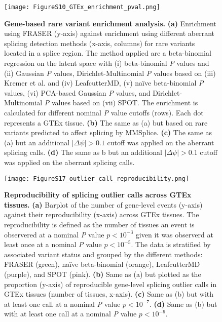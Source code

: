 \documentclass[a4paper,12pt]{article}
\begin{document}
\begin{figure}[h]
\centering
	\texttt{[image: FigureS10\_GTEx\_enrichment\_pval.png]}
	\caption{
	    \textbf{Gene-based rare variant enrichment analysis.}
	    \textbf{(a)} Enrichment using FRASER (y-axis) against enrichment using
different aberrant splicing detection methods (x-axis, columns) for rare variants
located in a splice region. The method applied are a beta-binomial regression on 
the latent space with (i) beta-binomial \textit{P} values and (ii) Gaussian
\textit{P} values, Dirichlet-Multinomial \textit{P} values based on
(iii) Kremer et al. and (iv) LeafcutterMD, (v) na\"ive beta-binomial \textit{P} values, (vi) 
PCA-based Gaussian \textit{P} values, and Dirichlet-Multinomial \textit{P}
values based on (vii) SPOT. The enrichment is calculated for different 
nominal \textit{P} value cutoffs (rows). Each dot represents a GTEx tissue. 
\textbf{(b)} The same as (a) but based on rare variants predicted to affect splicing by MMSplice.
\textbf{(c)} The same as (a) but an additional $|\Delta\psi| > 0.1$ cutoff was
applied on the aberrant splicing calls. \textbf{(d)} The same
as b but an additional $|\Delta\psi| > 0.1$ cutoff was applied on the aberrant 
splicing calls.
}
\end{figure}
\pagebreak


\begin{figure}[h]
\centering
	\texttt{[image: FigureS17\_outlier\_call\_reproducibility.png]}
	\caption{\textbf{Reproducibility of splicing outlier calls across GTEx tissues.}
        \textbf{(a)} Barplot of the number of gene-level events (y-axis) against
their reproducibility (x-axis) across GTEx tissues. The reproducibility is 
defined as the number of tissues an event is observered at a nominal \textit{P}
value $p < 10^{-3}$ given it was observerd at least once at a nominal \textit{P}
value $p < 10^{-5}$. The data is stratified by associated variant status and 
grouped by the different methods: FRASER (green), na\"ive beta-binomial (orange),
LeafcutterMD (purple), and SPOT (pink). 
\textbf{(b)} Same as (a) but plotted as the proportion (y-axis) of reproducible 
gene-level splicing outlier calls in GTEx tissues (number of tissues, x-axis). 
\textbf{(c)} Same as (b) but with at least one call at a nominal \textit{P} value $p < 10^{-7}$.
\textbf{(d)} Same as (b) but with at least one call at a nominal \textit{P} value $p < 10^{-9}$.
}
\end{figure}
\pagebreak
\end{document}
